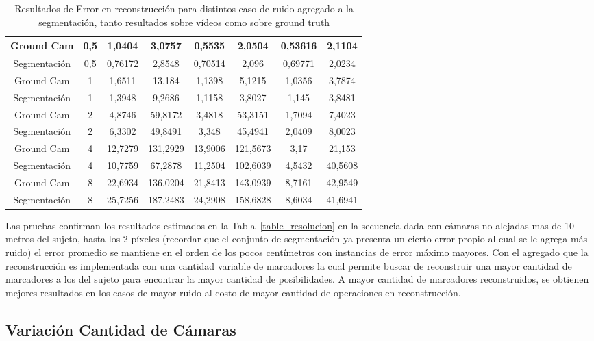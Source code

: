 \begin{table}[h]
{\begin{tabular}{cc|c|c|c|c|c|c|}
\multicolumn{1}{|c|}{Ground Cam} & 0,5 & 1,0404 & 3,0757 & 0,5535 & 2,0504 & 0,53616 & 2,1104 \\ \hline
\multicolumn{1}{|c|}{Segmentación} & 0,5 & 0,76172 & 2,8548 & 0,70514 & 2,096 & 0,69771 & 2,0234 \\ \hline
\multicolumn{1}{|c|}{Ground Cam} & 1 & 1,6511 & 13,184 & 1,1398 & 5,1215 & 1,0356 & 3,7874 \\ \hline
\multicolumn{1}{|c|}{Segmentación} & 1 & 1,3948 & 9,2686 & 1,1158 & 3,8027 & 1,145 & 3,8481 \\ \hline
\multicolumn{1}{|c|}{Ground Cam} & 2 & 4,8746 & 59,8172 & 3,4818 & 53,3151 & 1,7094 & 7,4023 \\ \hline
\multicolumn{1}{|c|}{Segmentación} & 2 & 6,3302 & 49,8491 & 3,348 & 45,4941 & 2,0409 & 8,0023 \\ \hline
\multicolumn{1}{|c|}{Ground Cam} & 4 & 12,7279 & 131,2929 & 13,9006 & 121,5673 & 3,17 & 21,153 \\ \hline
\multicolumn{1}{|c|}{Segmentación} & 4 & 10,7759 & 67,2878 & 11,2504 & 102,6039 & 4,5432 & 40,5608 \\ \hline
\multicolumn{1}{|c|}{Ground Cam} & 8 & 22,6934 & 136,0204 & 21,8413 & 143,0939 & 8,7161 & 42,9549 \\ \hline
\multicolumn{1}{|c|}{Segmentación} & 8 & 25,7256 & 187,2483 & 24,2908 & 158,6828 & 8,6034 & 41,6941 \\ \hline
\end{tabular}
}
\caption{Resultados de Error en reconstrucción para distintos caso de ruido agregado a la segmentación, tanto resultados sobre vídeos como sobre ground truth}
\end{table}

Las pruebas confirman los resultados estimados en la Tabla~\ref{table_resolucion} en la secuencia dada con cámaras no alejadas mas de 10 metros del sujeto, hasta los 2 píxeles (recordar que el conjunto de segmentación ya presenta un cierto error propio al cual se le agrega más ruido) el error promedio se mantiene en el orden de los pocos centímetros con instancias de error máximo mayores. Con el agregado que la reconstrucción es implementada con una cantidad variable de marcadores la cual permite buscar de reconstruir una mayor cantidad de marcadores a los del sujeto para encontrar la mayor cantidad de posibilidades. A mayor cantidad de marcadores reconstruidos, se obtienen mejores resultados en los casos de mayor ruido al costo de mayor cantidad de operaciones en reconstrucción.

\subsection{Variación Cantidad de Cámaras}

